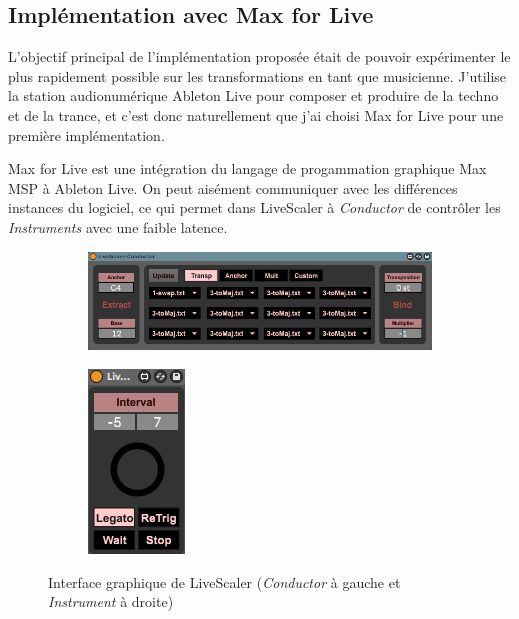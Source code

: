 \subsection{Implémentation avec Max for Live}

L'objectif principal de l'implémentation proposée était de pouvoir expérimenter le plus rapidement possible sur les transformations en tant que musicienne. J'utilise la station audionumérique Ableton Live pour composer et produire de la techno et de la trance, et c'est donc naturellement que j'ai choisi Max for Live pour une première implémentation. 

Max for Live est une intégration du  langage de progammation graphique Max MSP à Ableton Live. On peut aisément communiquer avec les différences instances du logiciel, ce qui permet dans LiveScaler à \emph{Conductor} de contrôler les \emph{Instruments} avec une faible latence.

\begin{figure}[htbp]
  \centering
  \begin{subfigure}{0.86\textwidth}
    \includegraphics{Figures/LS-Conductor-UI.png}
  \end{subfigure}
  \begin{subfigure}{0.13\textwidth}
    \includegraphics{Figures/LS-Instrument-UI.png}
    
  \end{subfigure}
  \caption{Interface graphique de LiveScaler (\emph{Conductor} à gauche et \emph{Instrument} à droite)}
\end{figure}